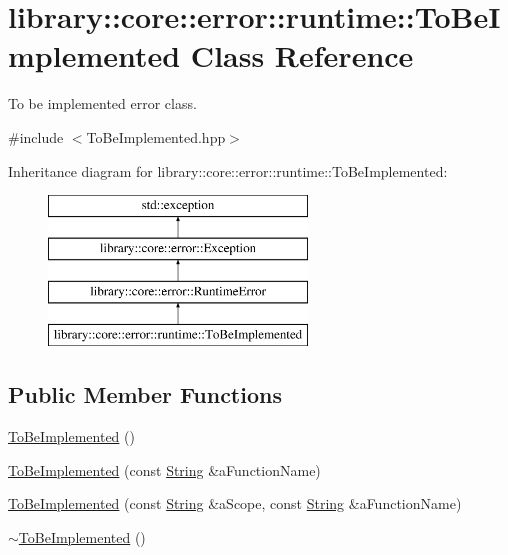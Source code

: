 \hypertarget{classlibrary_1_1core_1_1error_1_1runtime_1_1_to_be_implemented}{}\section{library\+:\+:core\+:\+:error\+:\+:runtime\+:\+:To\+Be\+Implemented Class Reference}
\label{classlibrary_1_1core_1_1error_1_1runtime_1_1_to_be_implemented}


To be implemented error class.  




{\ttfamily \#include $<$To\+Be\+Implemented.\+hpp$>$}

Inheritance diagram for library\+:\+:core\+:\+:error\+:\+:runtime\+:\+:To\+Be\+Implemented\+:\begin{figure}[H]
\begin{center}
\leavevmode
\includegraphics[height=4.000000cm]{classlibrary_1_1core_1_1error_1_1runtime_1_1_to_be_implemented}
\end{center}
\end{figure}
\subsection*{Public Member Functions}
\begin{DoxyCompactItemize}
\item 
\hyperlink{classlibrary_1_1core_1_1error_1_1runtime_1_1_to_be_implemented_aa98b3ae5c0ee3329a09b4b03bf27cf85}{To\+Be\+Implemented} ()
\item 
\hyperlink{classlibrary_1_1core_1_1error_1_1runtime_1_1_to_be_implemented_aee7854f221ff5bdade9cb8d67267b6ba}{To\+Be\+Implemented} (const \hyperlink{classlibrary_1_1core_1_1types_1_1_string}{String} \&a\+Function\+Name)
\item 
\hyperlink{classlibrary_1_1core_1_1error_1_1runtime_1_1_to_be_implemented_a97439e9669fa5c1926de93fc0446f583}{To\+Be\+Implemented} (const \hyperlink{classlibrary_1_1core_1_1types_1_1_string}{String} \&a\+Scope, const \hyperlink{classlibrary_1_1core_1_1types_1_1_string}{String} \&a\+Function\+Name)
\item 
\hyperlink{classlibrary_1_1core_1_1error_1_1runtime_1_1_to_be_implemented_a4d6d8204b46f1f5eb41458849a891787}{$\sim$\+To\+Be\+Implemented} ()
\end{DoxyCompactItemize}



